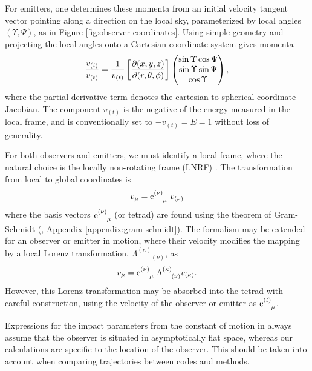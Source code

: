 For emitters, one determines these momenta from an initial velocity tangent vector pointing along a direction on the local sky, parameterized by local angles $(\Upsilon, \Psi)$, as in Figure \ref{fig:observer-coordinates}. Using simple geometry and projecting the local angles onto a Cartesian coordinate system gives momenta
\begin{equation}
    \label{eq:local-angle-to-velocity}
    \frac{v_{(i)}}{v_{(t)}} = \frac{1}{v_{(t)}}
    \left[\frac{\partial (x, y, z)}{\partial (r, \theta, \phi)}\right]
    \left(
    \begin{matrix}
        \sin \Upsilon \cos \Psi \\
        \sin \Upsilon \sin \Psi \\
        \cos \Upsilon \\
    \end{matrix}
    \right),
\end{equation}
where the partial derivative term denotes the cartesian to spherical coordinate Jacobian. The component $v_{(t)}$ is the negative of the energy measured in the local frame, and is conventionally set to $-v_{(t)} = E = 1$ without loss of generality. 

For both observers and emitters, we must identify a local frame, where the natural choice is the locally non-rotating frame (LNRF) \citep{bardeen_rotating_1972} . The transformation from local to global coordinates is
\begin{equation}
    \label{eq:local-to-global-velocity}
    v_\mu = \text{e}^{(\nu)}_{\phantom{(\nu)}\mu}\  v_{(\nu)}
\end{equation}
where the basis vectors $\text{e}^{(\nu)}_{\phantom{(\nu)}\mu}$ (or tetrad) are found using the theorem of Gram-Schmidt (\citealp{schmidt_uber_1989}, Appendix \ref{appendix:gram-schmidt}). The formalism may be extended for an observer or emitter in motion, where their velocity modifies the mapping by a local Lorenz transformation, $\Lambda^{(\kappa)}_{\phantom{(\kappa)}(\nu)}$, as 
\begin{equation}
    v_\mu = \text{e}^{(\nu)}_{\phantom{(\nu)}\mu}\  \Lambda^{(\kappa)}_{\phantom{(a)}(\nu)} v_{(\kappa)}.
\end{equation}
However, this Lorenz transformation may be absorbed into the tetrad with careful construction, using the velocity of the observer or emitter as $\utensor{\e}{(t)}{\mu}$.

Expressions for the impact parameters from the constant of motion in \cite{cunningham_optical_1973} always assume that the observer is situated in asymptotically flat space, whereas our calculations are specific to the location of the observer. This should be taken into account when comparing trajectories between codes and methods.

